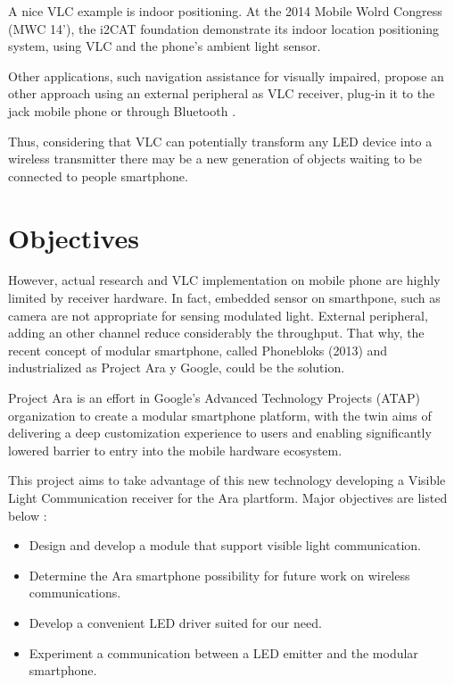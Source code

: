 A nice VLC example is indoor positioning. At the 2014 Mobile Wolrd Congress (MWC 14'), the i2CAT foundation demonstrate its indoor location positioning system, using VLC and the phone's ambient light sensor.

Other applications, such navigation assistance for visually impaired, propose an other approach using an external peripheral as VLC receiver, plug-in it to the jack mobile phone or through Bluetooth \citep{bluereceiver}.

Thus, considering that VLC can potentially transform any LED device into a wireless transmitter there may be a new generation of objects waiting to be connected to people smartphone.



\section{Objectives}
However, actual research and VLC implementation on mobile phone are highly limited by receiver hardware. In fact, embedded sensor on smarthpone, such as camera are not appropriate for sensing modulated light. External peripheral, adding an other channel reduce considerably the throughput.
That why, the recent concept of modular smartphone, called Phonebloks (2013) and industrialized as Project Ara y Google, could be the solution.

Project Ara is an effort in Google's Advanced Technology Projects (ATAP) organization to create a modular smartphone platform, with the twin aims of delivering a deep customization experience to users and enabling significantly lowered barrier to entry into the mobile hardware ecosystem.

This project aims to take advantage of this new technology developing a Visible Light Communication receiver for the Ara plartform. Major objectives are listed below :
\begin{itemize}
\item Design and develop a module that support visible light communication.
\item Determine the Ara smartphone possibility for future work on wireless communications.
\item Develop a convenient LED driver suited for our need. 
\item Experiment a communication between a LED emitter and the modular smartphone.
\end{itemize}


